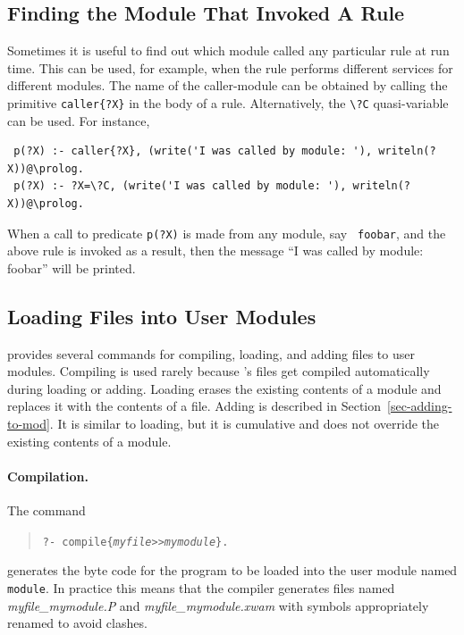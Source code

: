 \documentclass[11pt]{article}
\newcommand{\ERGO}{\mbox{\smaller{\ensuremath{\cal{E}}\smaller{{\sc{RGO}}}}}\xspace}
\newcommand{\FLSYSTEM}{\ERGO}
\newcommand{\bs}{\textbackslash}
\newcommand{\ofile}{xwam}
\begin{document}
\subsection{Finding the Module That Invoked A Rule}

\index{{\tt \bs{}?C} quasi-variable}
Sometimes it is useful to find out which module called any particular rule
at run time. This can be used, for example, when the rule performs
different services for different modules. The name of the caller-module can
be obtained by calling the primitive {\tt caller\{?X\}}  in the body of a rule.
Alternatively, the \texttt{\bs{}?C} quasi-variable can be used. 
For instance, 
\begin{verbatim}
 p(?X) :- caller{?X}, (write('I was called by module: '), writeln(?X))@\prolog.
 p(?X) :- ?X=\?C, (write('I was called by module: '), writeln(?X))@\prolog.
\end{verbatim}
When a call to predicate {\tt p(?X)} is made from any module, say {\tt
  foobar}, and the above rule is invoked as a result, then the message ``I
was called by module: foobar'' will be printed. 


\subsection{Loading Files into User Modules}\label{sec-loading-mods}


\FLSYSTEM provides several commands for compiling, loading, and adding
files to user modules. 
Compiling is used rarely because \FLSYSTEM's files get compiled
automatically during loading or adding.
Loading erases the existing contents of a module and replaces it with the
contents of a file.
Adding is described in Section~\ref{sec-adding-to-mod}.
It is similar to loading, but it is cumulative and does not
override the existing contents of a module. 

\paragraph{Compilation.}
The command 
\begin{quote}
  {\tt ?- compile\{{\it myfile}>{}>{\it mymodule}\}.}
\end{quote}
generates the byte code for the program to be loaded into the user module
named {\tt module}. In
practice this means that the compiler generates files named
\emph{myfile\_mymodule.P} and \emph{myfile\_mymodule.\ofile} with symbols appropriately
renamed to avoid clashes.
\end{document}
